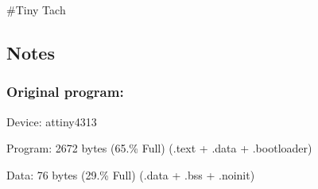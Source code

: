\#\+Tiny Tach

\subsection*{Notes}

\subsubsection*{Original program\+:}

Device\+: attiny4313

Program\+: 2672 bytes (65.\% Full) (.text + .data + .bootloader)

Data\+: 76 bytes (29.\% Full) (.data + .bss + .noinit) 